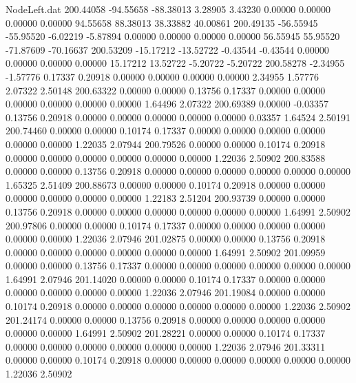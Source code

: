 \begin{filecontents}{NodeLeft.dat}
 200.44058  -94.55658  -88.38013     3.28905    3.43230    0.00000    0.00000    0.00000    0.00000   94.55658   88.38013   38.33882   40.00861
 200.49135  -56.55945  -55.95520    -6.02219   -5.87894    0.00000    0.00000    0.00000    0.00000   56.55945   55.95520  -71.87609  -70.16637
 200.53209  -15.17212  -13.52722    -0.43544   -0.43544    0.00000    0.00000    0.00000    0.00000   15.17212   13.52722   -5.20722   -5.20722
 200.58278   -2.34955   -1.57776     0.17337    0.20918    0.00000    0.00000    0.00000    0.00000    2.34955    1.57776    2.07322    2.50148
 200.63322    0.00000    0.00000     0.13756    0.17337    0.00000    0.00000    0.00000    0.00000    0.00000    0.00000    1.64496    2.07322
 200.69389    0.00000   -0.03357     0.13756    0.20918    0.00000    0.00000    0.00000    0.00000    0.00000    0.03357    1.64524    2.50191
 200.74460    0.00000    0.00000     0.10174    0.17337    0.00000    0.00000    0.00000    0.00000    0.00000    0.00000    1.22035    2.07944
 200.79526    0.00000    0.00000     0.10174    0.20918    0.00000    0.00000    0.00000    0.00000    0.00000    0.00000    1.22036    2.50902
 200.83588    0.00000    0.00000     0.13756    0.20918    0.00000    0.00000    0.00000    0.00000    0.00000    0.00000    1.65325    2.51409
 200.88673    0.00000    0.00000     0.10174    0.20918    0.00000    0.00000    0.00000    0.00000    0.00000    0.00000    1.22183    2.51204
 200.93739    0.00000    0.00000     0.13756    0.20918    0.00000    0.00000    0.00000    0.00000    0.00000    0.00000    1.64991    2.50902
 200.97806    0.00000    0.00000     0.10174    0.17337    0.00000    0.00000    0.00000    0.00000    0.00000    0.00000    1.22036    2.07946
 201.02875    0.00000    0.00000     0.13756    0.20918    0.00000    0.00000    0.00000    0.00000    0.00000    0.00000    1.64991    2.50902
 201.09959    0.00000    0.00000     0.13756    0.17337    0.00000    0.00000    0.00000    0.00000    0.00000    0.00000    1.64991    2.07946
 201.14020    0.00000    0.00000     0.10174    0.17337    0.00000    0.00000    0.00000    0.00000    0.00000    0.00000    1.22036    2.07946
 201.19084    0.00000    0.00000     0.10174    0.20918    0.00000    0.00000    0.00000    0.00000    0.00000    0.00000    1.22036    2.50902
 201.24174    0.00000    0.00000     0.13756    0.20918    0.00000    0.00000    0.00000    0.00000    0.00000    0.00000    1.64991    2.50902
 201.28221    0.00000    0.00000     0.10174    0.17337    0.00000    0.00000    0.00000    0.00000    0.00000    0.00000    1.22036    2.07946
 201.33311    0.00000    0.00000     0.10174    0.20918    0.00000    0.00000    0.00000    0.00000    0.00000    0.00000    1.22036    2.50902

\end{filecontents}
